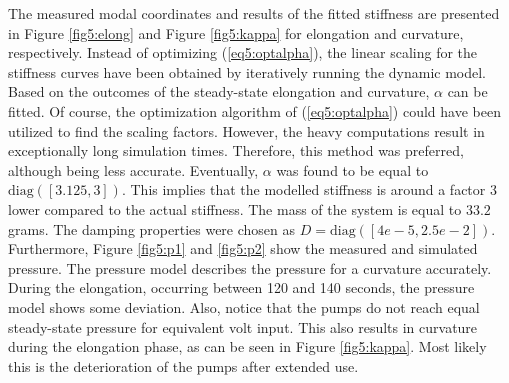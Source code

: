 The measured modal coordinates and results of the fitted stiffness are presented in Figure \ref{fig5:elong} and Figure \ref{fig5:kappa} for elongation and curvature, respectively. Instead of optimizing (\ref{eq5:optalpha}), the linear scaling for the stiffness curves have been obtained by iteratively running the dynamic model. Based on the outcomes of the steady-state elongation and curvature, $\alpha$ can be fitted. Of course, the optimization algorithm of (\ref{eq5:optalpha}) could have been utilized to find the scaling factors. However, the heavy computations result in exceptionally long simulation times. Therefore, this method was preferred, although being less accurate. Eventually, $\alpha$ was found to be equal to $\text{diag}([3.125,3])$. This implies that the modelled stiffness is around a factor 3 lower compared to the actual stiffness. The mass of the system is equal to $33.2$ grams. The damping properties were chosen as $D = \text{diag}([4e-5,2.5e-2])$. Furthermore, Figure \ref{fig5:p1} and \ref{fig5:p2} show the measured and simulated pressure. The pressure model describes the pressure for a curvature accurately. During the elongation, occurring between 120 and 140 seconds, the pressure model shows some deviation. Also, notice that the pumps do not reach equal steady-state pressure for equivalent volt input. This also results in curvature during the elongation phase, as can be seen in Figure \ref{fig5:kappa}. Most likely this is the deterioration of the pumps after extended use. 

